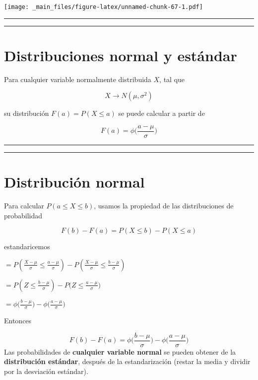 \documentclass[
]{book}
\begin{document}
\texttt{[image: \_main\_files/figure-latex/unnamed-chunk-67-1.pdf]}

\begin{center}\rule{0.5\linewidth}{0.5pt}\end{center}

\begin{center}\rule{0.5\linewidth}{0.5pt}\end{center}

\hypertarget{distribuciones-normal-y-estuxe1ndar}{%
\section{Distribuciones normal y estándar}\label{distribuciones-normal-y-estuxe1ndar}}

Para cualquier variable normalmente distribuida \(X\), tal que

\[X\rightarrow N(\mu, \sigma^2)\]

su distribución \(F(a)=P(X \leq a)\) se puede calcular a partir de

\[F(a)= \phi \big(\frac{a-\mu}{\sigma}\big)\]

\begin{center}\rule{0.5\linewidth}{0.5pt}\end{center}

\begin{center}\rule{0.5\linewidth}{0.5pt}\end{center}

\hypertarget{distribuciuxf3n-normal-7}{%
\section{Distribución normal}\label{distribuciuxf3n-normal-7}}

Para calcular \(P(a\leq X \leq b)\), usamos la propiedad de las distribuciones de probabilidad

\[F(b)-F(a)=P(X\leq b)-P(X\leq a)\]

estandaricemos

\(=P(\frac{X-\mu}{\sigma}\leq \frac{a-\mu}{\sigma})-P(\frac{X-\mu}{\sigma}\leq \frac{b-\mu}{\sigma})\)

\(=P(Z \leq \frac{b-\mu}{\sigma})-P(Z \leq \frac{a-\mu}{\sigma}\big)\)

\(=\phi \big(\frac{b-\mu}{\sigma}\big)-\phi \big(\frac{a-\mu}{\sigma}\big)\)

Entonces

\[F(b)-F(a)=\phi \big(\frac{b-\mu}{\sigma}\big)-\phi \big(\frac{a-\mu}{\sigma}\big)\]
Las probabilidades de \textbf{cualquier variable normal} se pueden obtener de la \textbf{distribución estándar}, después de la estandarización (restar la media y dividir por la desviación estándar).
\end{document}
